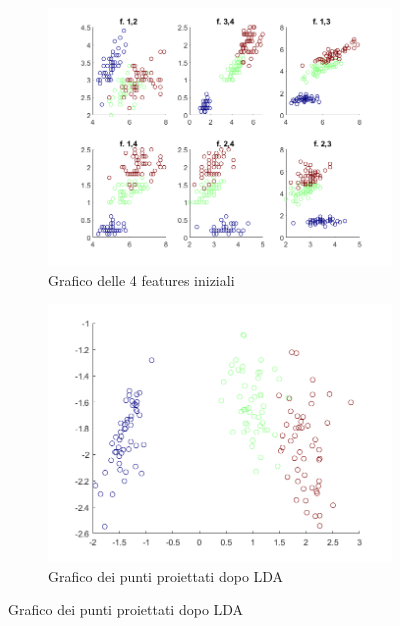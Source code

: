 \documentclass[a4paper,oneside,titlepage]{book}
\begin{document}
\begin{figure}[htp]
	\begin{subfigure}{0.49\textwidth}
	    \centering
		\includegraphics[width=\textwidth, height=\textheight, keepaspectratio]{lda-matlab-1.png}
		\caption{Grafico delle 4 features iniziali}
	\end{subfigure}
	\hfill
	\begin{subfigure}{0.49\textwidth}
	    \centering
		\includegraphics[width=\textwidth, height=\textheight, keepaspectratio]{lda-matlab-2.png}
		\caption{Grafico dei punti proiettati dopo LDA}
	\end{subfigure}
\end{figure}
\end{document}
